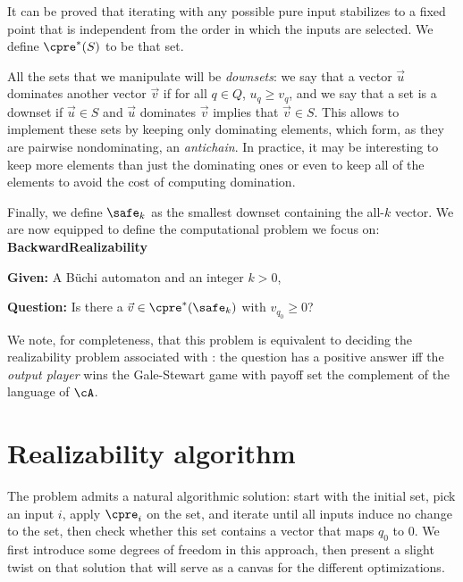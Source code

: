 \documentclass[sigconf,screen,nonacm]{acmart}
\begin{document}
It can be proved that iterating \cpre with any possible pure input stabilizes to
a fixed point that is independent from the order in which the inputs are
selected.  We define \(\cpre^*(S)\) to be that set.

All the sets that we manipulate will be \emph{downsets}: we say that a vector
\(\vec{u}\) dominates another vector \(\vec{v}\) if for all \(q \in Q\),
\(u_q \geq v_q\), and we say that a set is a downset if \(\vec{u} \in S\) and
\(\vec{u}\) dominates \(\vec{v}\) implies that \(\vec{v} \in S\).  This allows to
implement these sets by keeping only dominating elements, which form, as they
are pairwise nondominating, an \emph{antichain}.  In practice, it may be
interesting to keep more elements than just the dominating ones or even to keep
all of the elements to avoid the cost of computing domination.

Finally, we define \(\safe_k\) as the smallest downset containing the all-\(k\)
vector.
We are now equipped to define the computational problem we focus on:\\[1em]
\textbf{BackwardRealizability}
\begin{compactitem}
\item \textbf{Given:} A Büchi automaton \cA and an integer \(k > 0\),
\item \textbf{Question:} Is there a \(\vec{v} \in \cpre^*(\safe_k)\) with \(v_{q_0} \geq
  0\)?
\end{compactitem}
\vspace{1em}

We note, for completeness, that this problem is equivalent to deciding the
realizability problem associated with \cA: the question has a positive answer
iff the \emph{output player} wins the Gale-Stewart game with payoff set the
complement of the language of \(\cA\).

\section{Realizability algorithm}

The problem 
admits a natural algorithmic solution: start with the initial
set, pick an input \(i\), apply \(\cpre_i\) on the set, and iterate until all inputs
induce no change to the set, then check whether this set contains a vector that
maps \(q_0\) to \(0\).  We first introduce some degrees of freedom in this approach,
then present a slight twist on that solution that will serve as a canvas for the
different optimizations.
\end{document}
